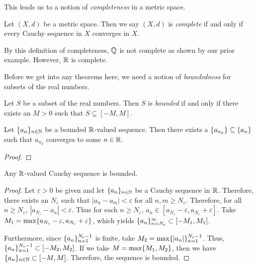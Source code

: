 \documentclass[notitlepage]{simple}
\begin{document}
This leads us to a notion of \textit{completeness} in a metric space.

\begin{definition}
	Let $(X,d)$ be a metric space.
	Then we say $(X,d)$ is \textit{complete} if and only if every Cauchy sequence in $X$ converges in $X$.
\end{definition}
By this definition of completeness, $\mathbb{Q}$ is not complete as shown by our prior example.
However, $\mathbb{R}$ is complete.

Before we get into any theorems here, we need a notion of \textit{boundedness} for subsets of the real numbers.

\begin{definition}[Bounded]
	Let $S$ be a subset of the real numbers.
	Then $S$ is \textit{bounded} if and only if there exists an $M>0$ such that $S\subseteq [-M,M]$.
\end{definition}

\begin{thm}
	Let $\lbrace a_n \rbrace_{n\in\mathbb{N}}$ be a bounded $\mathbb{R}$-valued sequence.
	Then there exists a $\lbrace a_{n_k} \rbrace\subseteq\lbrace a_n \rbrace$ such that $a_{n_k}$ converges to some $a\in\mathbb{R}$.
\end{thm}
\begin{proof}

\end{proof}

\begin{lemma}
	Any $\mathbb{R}$-valued Cauchy sequence is bounded.
\end{lemma}
\begin{proof}
	Let $\varepsilon >0$ be given and let $\lbrace a_n \rbrace_{n\in\mathbb{N}}$ be a Cauchy sequence in $\mathbb{R}$.
	Therefore, there exists an $N_\varepsilon$ such that $|a_n-a_m|<\varepsilon$ for all $n,m\geq N_\varepsilon$.
	Therefore, for all $n\geq N_\varepsilon$, $|a_{N_\varepsilon}-a_n|<\varepsilon$.
	Thus for each $n\geq N_\varepsilon$, $a_n\in[a_{N_\varepsilon}-\varepsilon,a_{N_\varepsilon}+\varepsilon]$.
	Take $M_1=\max\lbrace a_{N_\varepsilon}-\varepsilon,a_{N_\varepsilon}+\varepsilon \rbrace$, which yields $\lbrace a_n \rbrace_{n=N_\varepsilon}^\infty\subset[-M_1,M_1]$.

	Furthermore, since $\lbrace a_n \rbrace_{n=1}^{N_\varepsilon-1}$ is finite, take $M_2=\max\lbrace |a_n| \rbrace_{n=1}^{N_\varepsilon-1}$.
	Thus, $\lbrace a_n \rbrace_{n=1}^{N_\varepsilon-1}\subset [-M_2,M_2]$.
	If we take $M=\max\lbrace M_1,M_2 \rbrace$, then we have $\lbrace a_n \rbrace_{n\in\mathbb{N}}\subset[-M,M]$.
	Therefore, the sequence is bounded.
\end{proof}
\end{document}
